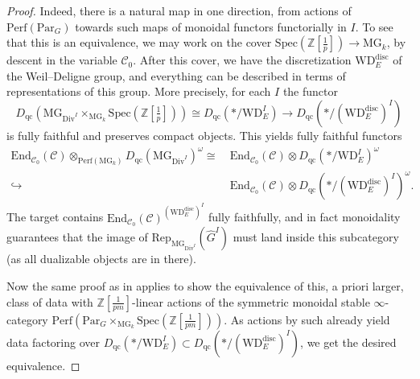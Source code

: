\documentclass[11pt]{amsart}
\numberwithin{equation}{section}
\numberwithin{theorem}{section}
\theoremstyle{definition}
\begin{document}
\begin{proof} Indeed, there is a natural map in one direction, from actions of $\mathrm{Perf}(\mathrm{Par}_G)$ towards such maps of monoidal functors functorially in $I$. To see that this is an equivalence, we may work on the cover $\mathrm{Spec}(\mathbb Z[\tfrac 1p])\to \mathrm{MG}_k$, by descent in the variable $\mathcal C_0$. After this cover, we have the discretization $\mathrm{WD}_E^{\mathrm{disc}}$ of the Weil--Deligne group, and everything can be described in terms of representations of this group. More precisely, for each $I$ the functor
\[
D_{\mathrm{qc}}(\mathrm{MG}_{\mathrm{Div}^I}\times_{\mathrm{MG}_k} \mathrm{Spec}(\mathbb Z[\tfrac 1p]))\cong D_{\mathrm{qc}}(\ast/\mathrm{WD}_E^I)\to D_{\mathrm{qc}}(\ast/(\mathrm{WD}_E^{\mathrm{disc}})^I)
\]
is fully faithful and preserves compact objects. This yields fully faithful functors
\[\begin{aligned}
\mathrm{End}_{\mathcal C_0}(\mathcal C)\otimes_{\mathrm{Perf}(\mathrm{MG}_k)} D_{\mathrm{qc}}(\mathrm{MG}_{\mathrm{Div}^I})^\omega\cong &\ \mathrm{End}_{\mathcal C_0}(\mathcal C)\otimes D_{\mathrm{qc}}(\ast/\mathrm{WD}_E^I)^\omega\\
\hookrightarrow &\ \mathrm{End}_{\mathcal C_0}(\mathcal C)\otimes D_{\mathrm{qc}}(\ast/(\mathrm{WD}_E^{\mathrm{disc}})^I)^\omega.
\end{aligned}\]
The target contains $\mathrm{End}_{\mathcal C_0}(\mathcal C)^{(\mathrm{WD}_E^{\mathrm{disc}})^I}$ fully faithfully, and in fact monoidality guarantees that the image of $\mathrm{Rep}_{\mathrm{MG}_{\mathrm{Div}^I}}(\widehat{G}^I)$ must land inside this subcategory (as all dualizable objects are in there).

Now the same proof as in \cite[Section X.3]{FarguesScholze} applies to show the equivalence of this, a priori larger, class of data with $\mathbb Z[\tfrac 1{pm}]$-linear actions of the symmetric monoidal stable $\infty$-category $\mathrm{Perf}(\mathrm{Par}_G\times_{\mathrm{MG}_k} \mathrm{Spec}(\mathbb Z[\tfrac 1{pm}]))$. As actions by such already yield data factoring over $D_{\mathrm{qc}}(\ast/\mathrm{WD}_E^I)\subset D_{\mathrm{qc}}(\ast/(\mathrm{WD}_E^{\mathrm{disc}})^I)$, we get the desired equivalence.
\end{proof}
\end{document}
